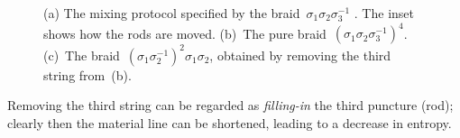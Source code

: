\documentclass[12pt]{article}
\begin{document}
\begin{figure}
\begin{center}
{  \label{fig:s1s2s-3_4_diagram}
}\hspace{2em}
\end{center}
\caption{(a) The mixing protocol specified by the
  braid~$\sigma_1\sigma_2\sigma_3^{-1}$ \citep{Thiffeault2008b}.  The inset
  shows how the rods are moved.  (b)~The pure 
  braid~$(\sigma_1\sigma_2\sigma_3^{-1})^4$.  (c)~The
  braid~$(\sigma_1\sigma_2^{-1})^2\sigma_1\sigma_2$, obtained by removing the
  third string from~(b).}
\end{figure}
%
Removing the third string can be regarded as \emph{filling-in} the third
puncture (rod); clearly then the material line can be shortened, leading to a
decrease in entropy.
\end{document}

